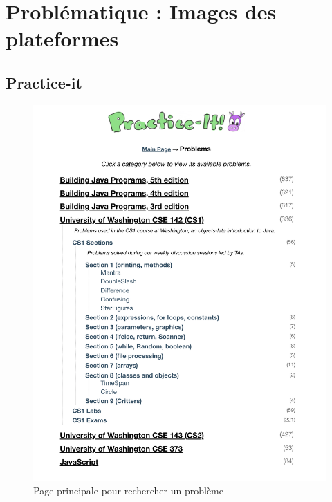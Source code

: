 \chapter{Problématique : Images des plateformes}
\label{annexe:problematique}

\section{Practice-it}

\begin{figure}[H]
    \includegraphics[width=\textwidth,height=0.6\textheight,keepaspectratio]{images/comparison/practice-it-1.png}
    \centering
    \caption[Practice-it : page principale pour rechercher un problème]{Page principale pour rechercher un problème}
\end{figure}

